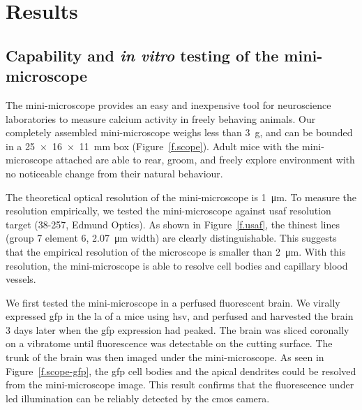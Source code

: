 \section{Results}

\subsection{Capability and \textit{in vitro} testing of the mini-microscope}
The mini-microscope provides an easy and inexpensive tool for neuroscience laboratories to measure calcium activity in freely behaving animals. Our completely assembled mini-microscope weighs less than \SI{3}{\g}, and can be bounded in a \SI{25 x 16 x 11}{\mm} box (Figure~\ref{f.scope}). Adult mice with the mini-microscope attached are able to rear, groom, and freely explore environment with no noticeable change from their natural behaviour.

The theoretical optical resolution of the mini-microscope is \SI{1}{\um}. To measure the resolution empirically, we tested the mini-microscope against \gls{usaf} resolution target (38-257, Edmund Optics). As shown in Figure~\ref{f.usaf}, the thinest lines (group 7 element 6, \SI{2.07}{\um} width) are clearly distinguishable. This suggests that the empirical resolution of the microscope is smaller than \SI{2}{\um}. With this resolution, the mini-microscope is able to resolve cell bodies and capillary blood vessels.

We first tested the mini-microscope in a perfused fluorescent brain. We virally expressed \gls{gfp} in the \gls{la} of a mice using \gls{hsv}, and perfused and harvested the brain 3 days later when the \gls{gfp} expression had peaked. The brain was sliced coronally on a vibratome until fluorescence was detectable on the cutting surface. The trunk of the brain was then imaged under the mini-microscope. As seen in Figure~\ref{f.scope-gfp}, the \gls{gfp} cell bodies and the apical dendrites could be resolved from the mini-microscope image. This result confirms that the fluorescence under  \gls{led} illumination can be reliably detected by the \gls{cmos} camera.

